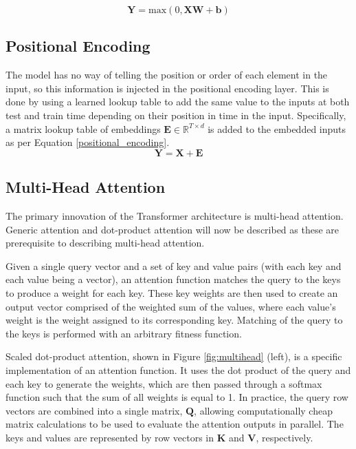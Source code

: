 \documentclass[conference]{IEEEtran}
\begin{document}
\begin{equation} \label{dense_layer}
\boldsymbol{Y} = \text{max}(0, \boldsymbol{XW} + \boldsymbol{b})
\end{equation}

\subsection{Positional Encoding}
The model has no way of telling the position or order of each element in the input, so this information is injected in the positional encoding layer.
This is done by using a learned lookup table to add the same value to the inputs at both test and train time depending on their position in time in the input.
Specifically, a matrix lookup table of embeddings $\boldsymbol{E} \in \mathbb{R}^{T \times d}$ is added to the embedded inputs as per Equation \ref{positional_encoding}.
\begin{equation}\label{positional_encoding}
\boldsymbol{Y} = \boldsymbol{X} + \boldsymbol{E}
\end{equation}

\subsection{Multi-Head Attention} \label{multihead_attention}
The primary innovation of the Transformer architecture is multi-head attention.
Generic attention and dot-product attention will now be described as these are prerequisite to describing multi-head attention.

Given a single query vector and a set of key and value pairs (with each key and each value being a vector), an attention function matches the query to the keys to produce a weight for each key.
These key weights are then used to create an output vector comprised of the weighted sum of the values, where each value's weight is the weight assigned to its corresponding key. 
Matching of the query to the keys is performed with an arbitrary fitness function.

Scaled dot-product attention, shown in Figure \ref{fig:multihead} (left), is a specific implementation of an attention function. 
It uses the dot product of the query and each key to generate the weights, which are then passed through a softmax function such that the sum of all weights is equal to 1.
In practice, the query row vectors are combined into a single matrix, $\boldsymbol{Q}$, allowing computationally cheap matrix calculations to be used to evaluate the attention outputs in parallel.
The keys and values are represented by row vectors in $\boldsymbol{K}$ and $\boldsymbol{V}$, respectively.
\end{document}
